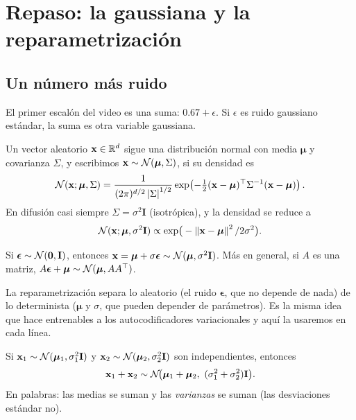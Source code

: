 \documentclass[11pt,letterpaper,oneside]{report}
\newcommand{\xb}{\mathbf{x}}
\newcommand{\eb}{\boldsymbol{\epsilon}}
\newcommand{\Ib}{\mathbf{I}}
\begin{document}
\section{Repaso: la gaussiana y la reparametrización}\label{sec:repaso}

\subsection{Un número más ruido}

El primer escalón del video es una suma: $0.67+\epsilon$. Si $\epsilon$ es ruido gaussiano estándar, la suma es otra variable gaussiana.

\begin{definicion}
Un vector aleatorio $\xb\in\R^d$ sigue una distribución normal con media $\boldsymbol\mu$ y covarianza $\Sigma$, y escribimos $\xb\sim\Normal(\boldsymbol\mu,\Sigma)$, si su densidad es
\[
\Normal(\xb;\boldsymbol\mu,\Sigma)=\frac{1}{(2\pi)^{d/2}\abs{\Sigma}^{1/2}}\exp\!\left(-\tfrac12(\xb-\boldsymbol\mu)^\top\Sigma^{-1}(\xb-\boldsymbol\mu)\right).
\]
En difusión casi siempre $\Sigma=\sigma^2\Ib$ (isotrópica), y la densidad se reduce a
\[\Normal(\xb;\boldsymbol\mu,\sigma^2\Ib)\propto\exp\!\big(-\norm{\xb-\boldsymbol\mu}^2/2\sigma^2\big).\]
\end{definicion}

\begin{teorema}[Reparametrización]
Si $\eb\sim\Normal(\mathbf 0,\Ib)$, entonces $\xb=\boldsymbol\mu+\sigma\eb\sim\Normal(\boldsymbol\mu,\sigma^2\Ib)$. Más en general, si $A$ es una matriz, $A\eb+\boldsymbol\mu\sim\Normal(\boldsymbol\mu,AA^\top)$.
\end{teorema}

La reparametrización separa lo aleatorio (el ruido $\eb$, que no depende de nada) de lo determinista ($\boldsymbol\mu$ y $\sigma$, que pueden depender de parámetros). Es la misma idea que hace entrenables a los autocodificadores variacionales y aquí la usaremos en cada línea.

\begin{teorema}\label{res:suma}
Si $\xb_1\sim\Normal(\boldsymbol\mu_1,\sigma_1^2\Ib)$ y $\xb_2\sim\Normal(\boldsymbol\mu_2,\sigma_2^2\Ib)$ son independientes, entonces
\[
\xb_1+\xb_2\sim\Normal\!\big(\boldsymbol\mu_1+\boldsymbol\mu_2,\ (\sigma_1^2+\sigma_2^2)\Ib\big).
\]
En palabras: las medias se suman y las \emph{varianzas} se suman (las desviaciones estándar no).
\end{teorema}
\end{document}
